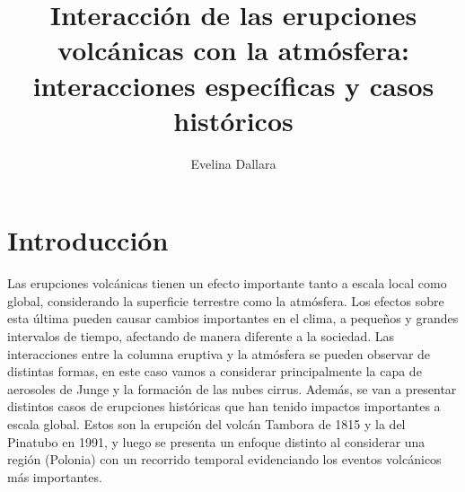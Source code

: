\documentclass[a4apaper,twocolumn,10pt]{article}
\begin{document}
\title{Interacción de las erupciones
volcánicas con la atmósfera:
interacciones específicas y casos históricos}
\author{Evelina Dallara}
\date{}

\section{Introducción}
Las erupciones volcánicas tienen un efecto importante tanto a escala local como global,
considerando la superficie terrestre como la atmósfera. Los efectos sobre esta última pueden
causar cambios importantes en el clima, a pequeños y grandes intervalos de tiempo, afectando
de manera diferente a la sociedad. Las interacciones entre la columna eruptiva y la atmósfera
se pueden observar de distintas formas, en este caso vamos a considerar principalmente la capa
de aerosoles de Junge y la formación de las nubes cirrus. Además, se van a presentar distintos
casos de erupciones históricas que han tenido impactos importantes a escala global. Estos son
la erupción del volcán Tambora de 1815 y la del Pinatubo en 1991, y luego se presenta un
enfoque distinto al considerar una región (Polonia) con un recorrido temporal evidenciando los
eventos volcánicos más importantes.
\end{document}
